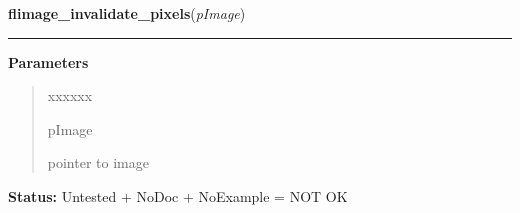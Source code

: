 \hspace{.8\funcindent}\begin{boxedminipage}{\funcwidth}

    \raggedright \textbf{flimage\_invalidate\_pixels}(\textit{pImage})

    \vspace{-1.5ex}

    \rule{\textwidth}{0.5\fboxrule}
\setlength{\parskip}{2ex}
\setlength{\parskip}{1ex}
      \textbf{Parameters}
      \vspace{-1ex}

      \begin{quote}
        \begin{Ventry}{xxxxxx}

          \item[pImage]

          pointer to image

        \end{Ventry}

      \end{quote}

\textbf{Status:} Untested + NoDoc + NoExample = NOT OK



    \end{boxedminipage}

    \label{xformslib:library:flimage_open}

    \vspace{0.5ex}

